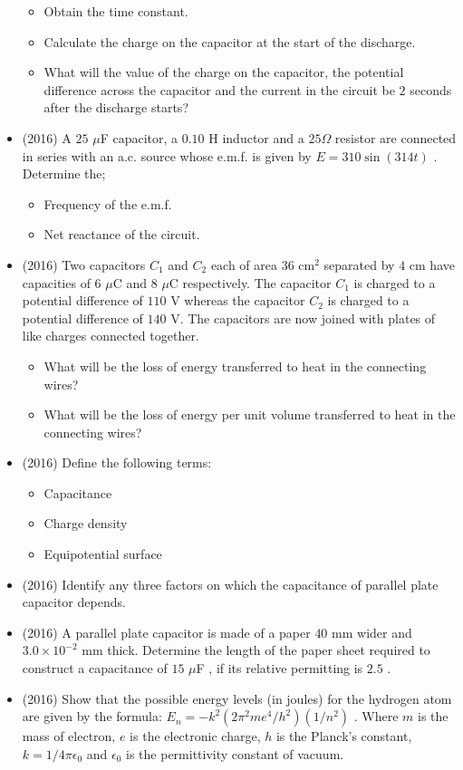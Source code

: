 \documentclass{article}
\begin{document}
\begin{itemize}
\begin{itemize}
\item Obtain the time constant.
\item Calculate the charge on the capacitor at the start of the discharge.
\item What will the value of the charge on the capacitor, the potential difference across the capacitor and the current in the circuit be $ 2$ seconds after the discharge starts?
\end{itemize}
\item (2016)  A $ 25$ $\mu$F capacitor, a $ 0.10$ H inductor and a $ 25\Omega $ resistor are connected in series with an a.c. source whose e.m.f. is given by $ E=310 \sin(314t)$ .  Determine the;
 \begin{itemize}
\item Frequency of the e.m.f.
\item Net reactance of the circuit.
\end{itemize}
\item (2016)  Two capacitors $ C_{1}$ and $ C_{2}$ each of area $ 36$ cm$ ^{2}$ separated by $ 4$ cm have capacities of $ 6$ $\mu$C and $ 8$ $\mu$C respectively.  The capacitor $ C_{1}$ is charged to a potential difference of $ 110$ V whereas the capacitor $ C_{2}$ is charged to a potential difference of $ 140$ V.  The capacitors are now joined with plates of like charges connected together.
 \begin{itemize}
\item What will be the loss of energy transferred to heat in the connecting wires?
\item What will be the loss of energy per unit volume transferred to heat in the connecting wires?
\end{itemize}
\item (2016)  Define the following terms:
 \begin{itemize}
\item Capacitance
\item Charge density
\item Equipotential surface
\end{itemize}
\item (2016)  Identify any three factors on which the capacitance of parallel plate capacitor depends.
\item (2016)  A parallel plate capacitor is made of a paper $ 40$ mm wider and $ 3.0 \times 10^{-2}$ mm thick.  Determine the length of the paper sheet required to construct a capacitance of $ 15$ $\mu$F , if its relative permitting is $ 2.5$ .
\item (2016)  Show that the possible energy levels (in joules) for the hydrogen atom are given by the formula: $ E_{n}=-k^{2}(2\pi^{2}me^{4}/h^{2})(1/n^{2})$ .  Where $ m$ is the mass of electron, $ e$ is the electronic charge, $ h$ is the Planck’s constant, $ k=1/4\pi\epsilon _{0}$ and $ \epsilon _{0}$ is the permittivity constant of vacuum.  

\end{itemize}
\end{document}
